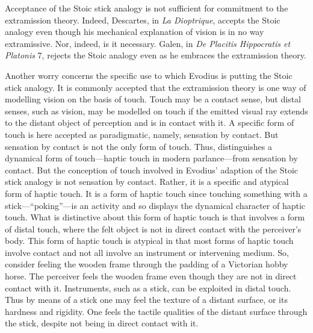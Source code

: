 \documentclass[12pt]{article}
\begin{document}
Acceptance of the Stoic stick analogy is not sufficient for commitment to the extramission theory. Indeed, Descartes, in \emph{La Dioptrique}, accepts the Stoic analogy even though his mechanical explanation of vision is in no way extramissive. Nor, indeed, is it necessary.  Galen, in \emph{De Placitis Hippocratis et Platonis} 7, rejects the Stoic analogy even as he embraces the extramission theory.

Another worry concerns the specific use to which Evodius is putting the Stoic stick analogy. It is commonly accepted that the extramission theory is one way of modelling vision on the basis of touch. Touch may be a contact sense, but distal senses, such as vision, may be modelled on touch if the emitted visual ray extends to the distant object of perception and is in contact with it. A specific form of touch is here accepted as paradigmatic, namely, sensation by contact. But sensation by contact is not the only form of touch. Thus, \citet{Broad:1952kx} distinguishes a dynamical form of touch---haptic touch in modern parlance---from sensation by contact. But the conception of touch involved in Evodius' adaption of the Stoic stick analogy is not sensation by contact. Rather, it is a specific and atypical form of haptic touch. It is a form of haptic touch since touching something with a stick---``poking''---is an activity and so displays the dynamical character of haptic touch. What is distinctive about this form of haptic touch is that involves a form of distal touch, where the felt object is not in direct contact with the perceiver's body. This form of haptic touch is atypical in that most forms of haptic touch involve contact and not all involve an instrument or intervening medium. So, consider feeling the wooden frame through the padding of a Victorian hobby horse. The perceiver feels the wooden frame even though they are not in direct contact with it. Instruments, such as a stick, can be exploited in distal touch. Thus by means of a stick one may feel the texture of a distant surface, or its hardness and rigidity. One feels the tactile qualities of the distant surface through the stick, despite not being in direct contact with it. 
\end{document}
